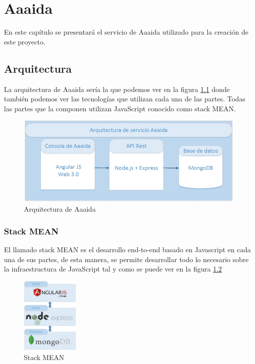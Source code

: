\chapter{Aaaida}

En este capítulo se presentará el servicio de Aaaida utilizado para la creación de este proyecto. 

\section{Arquitectura}

La arquitectura de Aaaida sería la que podemos ver en la figura \ref{a:arquitectura} donde también podemos ver las tecnologías que utilizan cada una de las partes. Todas las partes que la componen utilizan JavaScript conocido como stack MEAN. 

\begin{figure}[htb]
\begin{center}
\includegraphics[width=1\textwidth]{./setup/arquitectura}
\caption{Arquitectura de Aaaida}
\label{a:arquitectura}
\end{center}
\end{figure}

\subsection{Stack MEAN}

El llamado stack MEAN es el desarrollo end-to-end basado en Javascript en
cada una de sus partes, de esta manera, se permite desarrollar todo lo necesario
sobre la infraestructura de JavaScript tal y como se puede ver en la figura \ref{mean:MEAN}

\begin{figure}[htb]
\begin{center}
\includegraphics[width=0.25\textwidth]{./setup/MEAN}
\caption{Stack MEAN}
\label{mean:MEAN}
\end{center}
\end{figure}

